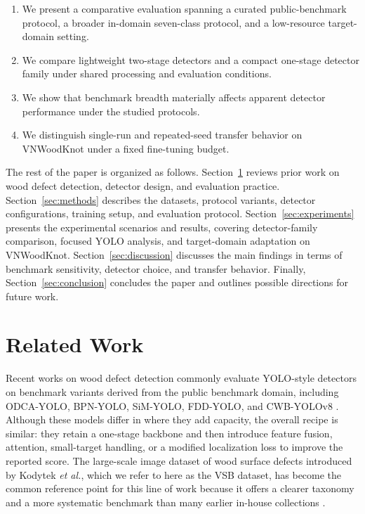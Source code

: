 \documentclass[10pt,a4paper]{article}
\begin{document}
\begin{enumerate}[leftmargin=1.5em]
  \item We present a comparative evaluation spanning a curated public-benchmark protocol, a broader in-domain seven-class protocol, and a low-resource target-domain setting.
  \item We compare lightweight two-stage detectors and a compact one-stage detector family under shared processing and evaluation conditions.
  \item We show that benchmark breadth materially affects apparent detector performance under the studied protocols.
    \item We distinguish single-run and repeated-seed transfer behavior on VNWoodKnot under a fixed fine-tuning budget.
\end{enumerate}

The rest of the paper is organized as follows. Section~\ref{sec:related-work} reviews prior work on wood defect detection, detector design, and evaluation practice. Section~\ref{sec:methods} describes the datasets, protocol variants, detector configurations, training setup, and evaluation protocol. Section~\ref{sec:experiments} presents the experimental scenarios and results, covering detector-family comparison, focused YOLO analysis, and target-domain adaptation on VNWoodKnot. Section~\ref{sec:discussion} discusses the main findings in terms of benchmark sensitivity, detector choice, and transfer behavior. Finally, Section~\ref{sec:conclusion} concludes the paper and outlines possible directions for future work.

\section{Related Work}
\label{sec:related-work}


Recent works on wood defect detection commonly evaluate YOLO-style detectors on benchmark variants derived from the public benchmark domain, including ODCA-YOLO, BPN-YOLO, SiM-YOLO, FDD-YOLO, and CWB-YOLOv8 \citep{odca_yolo,bpn_yolo,sim_yolo,fdd_yolo,an_cwb_yolov8}. Although these models differ in where they add capacity, the overall recipe is similar: they retain a one-stage backbone and then introduce feature fusion, attention, small-target handling, or a modified localization loss to improve the reported score. The large-scale image dataset of wood surface defects introduced by Kodytek \textit{et al.}, which we refer to here as the VSB dataset, has become the common reference point for this line of work because it offers a clearer taxonomy and a more systematic benchmark than many earlier in-house collections \citep{kodytek_dataset}.
\end{document}
